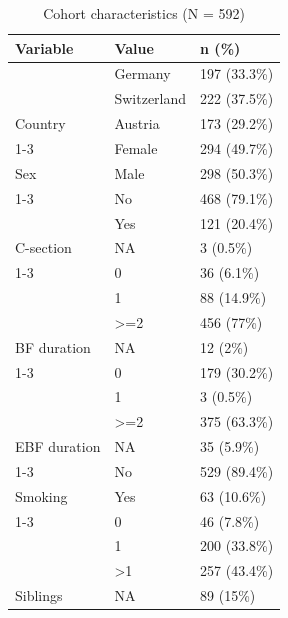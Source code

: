 \begin{table}[!h]
\centering
\caption{\label{tab:sample-characteristics}Cohort characteristics (N = 592)}
\centering
\begin{tabular}[t]{lll}
\toprule
Variable & Value & n (\%)\\
\midrule
 & Germany & 197 (33.3\%)\\

 & Switzerland & 222 (37.5\%)\\

\multirow[t]{-3}{*}{\raggedright\arraybackslash Country} & Austria & 173 (29.2\%)\\
\cmidrule{1-3}
 & Female & 294 (49.7\%)\\

\multirow[t]{-2}{*}{\raggedright\arraybackslash Sex} & Male & 298 (50.3\%)\\
\cmidrule{1-3}
 & No & 468 (79.1\%)\\

 & Yes & 121 (20.4\%)\\

\multirow[t]{-3}{*}{\raggedright\arraybackslash C-section} & NA & 3 (0.5\%)\\
\cmidrule{1-3}
 & 0 & 36 (6.1\%)\\

 & 1 & 88 (14.9\%)\\

 & >=2 & 456 (77\%)\\

\multirow[t]{-4}{*}{\raggedright\arraybackslash BF duration} & NA & 12 (2\%)\\
\cmidrule{1-3}
 & 0 & 179 (30.2\%)\\

 & 1 & 3 (0.5\%)\\

 & >=2 & 375 (63.3\%)\\

\multirow[t]{-4}{*}{\raggedright\arraybackslash EBF duration} & NA & 35 (5.9\%)\\
\cmidrule{1-3}
 & No & 529 (89.4\%)\\

\multirow[t]{-2}{*}{\raggedright\arraybackslash Smoking} & Yes & 63 (10.6\%)\\
\cmidrule{1-3}
 & 0 & 46 (7.8\%)\\

 & 1 & 200 (33.8\%)\\

 & >1 & 257 (43.4\%)\\

\multirow[t]{-4}{*}{\raggedright\arraybackslash Siblings} & NA & 89 (15\%)\\
\bottomrule
\end{tabular}
\end{table}
